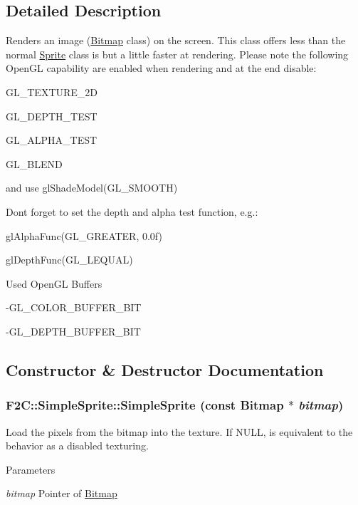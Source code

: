 \subsection{Detailed Description}
Renders an image (\hyperlink{class_f2_c_1_1_bitmap}{Bitmap} class) on the screen. This class offers less than the normal \hyperlink{class_f2_c_1_1_sprite}{Sprite} class is but a little faster at rendering. Please note the following OpenGL capability are enabled when rendering and at the end disable: \par
 GL\_\-TEXTURE\_\-2D \par
 GL\_\-DEPTH\_\-TEST \par
 GL\_\-ALPHA\_\-TEST \par
 GL\_\-BLEND \par
 and use glShadeModel(GL\_\-SMOOTH) \par
 \par
 Dont forget to set the depth and alpha test function, e.g.: \par
 glAlphaFunc(GL\_\-GREATER, 0.0f) \par
 glDepthFunc(GL\_\-LEQUAL) \par
 \par
 Used OpenGL Buffers \par
 -\/GL\_\-COLOR\_\-BUFFER\_\-BIT \par
 -\/GL\_\-DEPTH\_\-BUFFER\_\-BIT \par
 

\subsection{Constructor \& Destructor Documentation}
\hypertarget{class_f2_c_1_1_simple_sprite_a47a25751dcc327438aebf044bafb566d}{
\subsubsection[{SimpleSprite}]{\setlength{\rightskip}{0pt plus 5cm}F2C::SimpleSprite::SimpleSprite (const {\bf Bitmap} $\ast$ {\em bitmap})}}
\label{class_f2_c_1_1_simple_sprite_a47a25751dcc327438aebf044bafb566d}


Load the pixels from the bitmap into the texture. If NULL, is equivalent to the behavior as a disabled texturing. 
\begin{DoxyParams}{Parameters}
\item[{\em bitmap}]Pointer of \hyperlink{class_f2_c_1_1_bitmap}{Bitmap} \end{DoxyParams}


